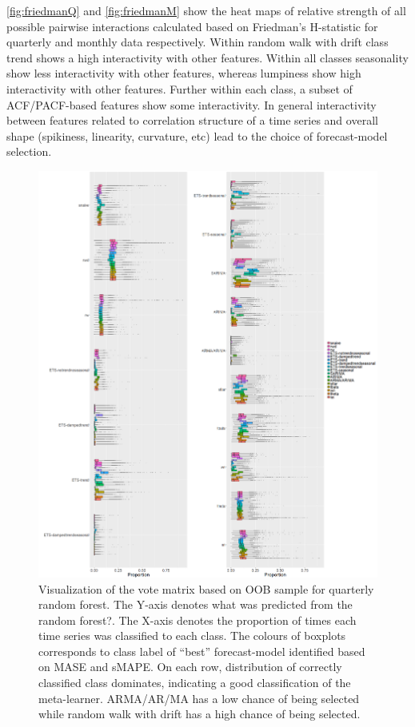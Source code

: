 \documentclass[11pt,a4paper,]{article}
\begin{document}
\autoref{fig:friedmanQ} and \autoref{fig:friedmanM} show the heat maps
of relative strength of all possible pairwise interactions calculated
based on Friedman's H-statistic for quarterly and monthly data
respectively. Within random walk with drift class trend shows a high
interactivity with other features. Within all classes seasonality show
less interactivity with other features, whereas lumpiness show high
interactivity with other features. Further within each class, a subset
of ACF/PACF-based features show some interactivity. In general
interactivity between features related to correlation structure of a
time series and overall shape (spikiness, linearity, curvature, etc)
lead to the choice of forecast-model selection.

\begin{figure}
\centering
\includegraphics{figures/oobquarterlymonthly1-1.png}
\caption{\label{fig:oobquarterlymonthly1}Visualization of the vote matrix
based on OOB sample for quarterly random forest. The Y-axis denotes what
was predicted from the random forest?. The X-axis denotes the proportion
of times each time series was classified to each class. The colours of
boxplots corresponds to class label of ``best'' forecast-model
identified based on MASE and sMAPE. On each row, distribution of
correctly classified class dominates, indicating a good classification
of the meta-learner. ARMA/AR/MA has a low chance of being selected while
random walk with drift has a high chance of being selected.}
\end{figure}
\end{document}
